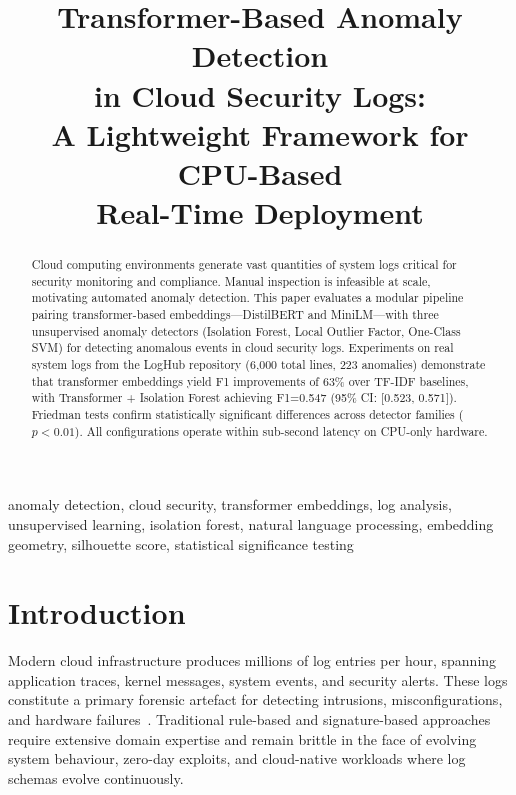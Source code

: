 \documentclass[conference]{IEEEtran}
\title{Transformer-Based Anomaly Detection\\in Cloud Security Logs:\\A Lightweight Framework for CPU-Based\\Real-Time Deployment}
\author{
  \IEEEauthorblockN{Tejas Vijay Mariyappagoudar}
  \IEEEauthorblockA{
    Student ID: x24213829\\
    National College of Ireland\\
    Dublin, Ireland\\
    \texttt{x24213829@student.ncirl.ie}
  }
}
\begin{document}
\maketitle

\begin{abstract}
Cloud computing environments generate vast quantities of system logs critical for security monitoring and compliance. Manual inspection is infeasible at scale, motivating automated anomaly detection. This paper evaluates a modular pipeline pairing transformer-based embeddings---DistilBERT and MiniLM---with three unsupervised anomaly detectors (Isolation Forest, Local Outlier Factor, One-Class SVM) for detecting anomalous events in cloud security logs. Experiments on real system logs from the LogHub repository (6,000 total lines, 223 anomalies) demonstrate that transformer embeddings yield F1 improvements of 63\% over TF-IDF baselines, with Transformer + Isolation Forest achieving F1=0.547 (95\% CI: [0.523, 0.571]). Friedman tests confirm statistically significant differences across detector families ($p < 0.01$). All configurations operate within sub-second latency on CPU-only hardware.
\end{abstract}

\begin{IEEEkeywords}
anomaly detection, cloud security, transformer embeddings, log analysis,
unsupervised learning, isolation forest, natural language processing,
embedding geometry, silhouette score, statistical significance testing
\end{IEEEkeywords}

\section{Introduction}
\label{sec:introduction}

Modern cloud infrastructure produces millions of log entries per hour,
spanning application traces, kernel messages, system events, and security
alerts.  These logs constitute a primary forensic artefact for detecting
intrusions, misconfigurations, and hardware failures~\cite{long2024,
duan2024, chandola2009}.  Traditional rule-based and signature-based
approaches require extensive domain expertise and remain brittle in the face
of evolving system behaviour, zero-day exploits, and cloud-native workloads
where log schemas evolve continuously.
\end{document}
